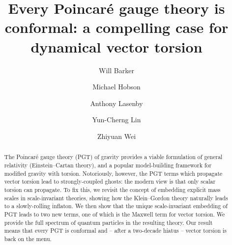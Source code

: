 \documentclass[aps,prd,reprint,preprintnumbers,showpacs,floatfix,nofootinbib,superscript address]{revtex4-2}
\begin{document}
\title{Every Poincar\'e gauge theory is conformal: a compelling case for dynamical vector torsion}

\author{Will Barker}

\author{Michael Hobson}

\author{Anthony Lasenby}

\author{Yun-Cherng Lin}

\author{Zhiyuan Wei}

\begin{abstract}
	The Poincar\'e gauge theory (PGT) of gravity provides a viable formulation of general relativity (Einstein--Cartan theory), and a popular model-building framework for modified gravity with torsion. Notoriously, however, the PGT terms which propagate vector torsion lead to strongly-coupled ghosts: the modern view is that only scalar torsion can propagate. To fix this, we revisit the concept of embedding explicit mass scales in scale-invariant theories, showing how the Klein--Gordon theory naturally leads to a slowly-rolling inflaton. We then show that the unique scale-invariant embedding of PGT leads to two new terms, one of which is the Maxwell term for vector torsion. We provide the full spectrum of quantum particles in the resulting theory. Our result means that every PGT is conformal and -- after a two-decade hiatus -- vector torsion is back on the menu.
\end{abstract}

\maketitle
\end{document}
